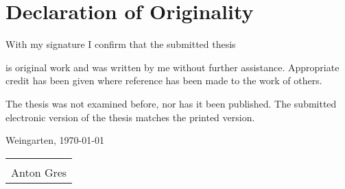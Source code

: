 \thispagestyle{empty} %
\section*{Declaration of Originality}

With my signature I confirm that the submitted thesis 

\large \batitle \normalsize

is original work and was written by me without further assistance. Appropriate credit has been given where reference has been made to the work of others.

The thesis was not examined before, nor has it been published. The submitted electronic version of the thesis matches the printed version.

\mydate
Weingarten, \today

\vspace{2cm}

\begin{tabular}{p{6cm}}
\hrulefill \\
\centering Anton Gres\\
\end{tabular}
